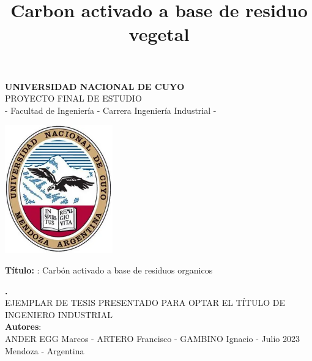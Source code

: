 \documentclass[12pt,a4paper,oneside]{book}
\begin{document}
\begin{titlepage}
 
\begin{center}
 
 {\huge \bf UNIVERSIDAD NACIONAL DE CUYO}\\[1.2cm]
 
{\Large PROYECTO FINAL DE ESTUDIO}\\{\Large  -  Facultad de Ingeniería - Carrera Ingeniería Industrial -}\\[2.0cm]


\begin{center}
\includegraphics[width=0.35\textwidth]{images/escudo-uncuyo.png}
\end{center}

\vspace{1.7cm}
{{\bf Título: }: }Carbón activado a base de residuos organicos
\title{Carbon activado a base de residuo vegetal} %
{\bf \large . }\\[1.7cm] %


{EJEMPLAR DE TESIS PRESENTADO PARA OPTAR EL TÍTULO DE INGENIERO INDUSTRIAL}\\[0.5cm]
 
{{\bf Autores}: }\\[0.5cm] %

{\large ANDER EGG Marcos - ARTERO Francisco - GAMBINO Ignacio  - Julio
2023}\\[0.8cm] %
{Mendoza - Argentina}
\end{center}

\end{titlepage}

\newpage
\newpage
$\ $
\thispagestyle{empty} %

\end{document}
